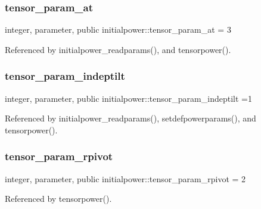 \mbox{\label{namespaceinitialpower_a1ab75aba3a08150a1e0c54913880e1be}} 
\subsubsection{\texorpdfstring{tensor\+\_\+param\+\_\+at}{tensor\_param\_at}}
{\footnotesize\ttfamily integer, parameter, public initialpower\+::tensor\+\_\+param\+\_\+at = 3}



Referenced by initialpower\+\_\+readparams(), and tensorpower().

\mbox{\label{namespaceinitialpower_a08c3c750bc5c8657967d99b3f0b9585e}} 
\subsubsection{\texorpdfstring{tensor\+\_\+param\+\_\+indeptilt}{tensor\_param\_indeptilt}}
{\footnotesize\ttfamily integer, parameter, public initialpower\+::tensor\+\_\+param\+\_\+indeptilt =1}



Referenced by initialpower\+\_\+readparams(), setdefpowerparams(), and tensorpower().

\mbox{\label{namespaceinitialpower_a610fa4412cca71c3692bd468cd0df5ec}} 
\subsubsection{\texorpdfstring{tensor\+\_\+param\+\_\+rpivot}{tensor\_param\_rpivot}}
{\footnotesize\ttfamily integer, parameter, public initialpower\+::tensor\+\_\+param\+\_\+rpivot = 2}



Referenced by tensorpower().

